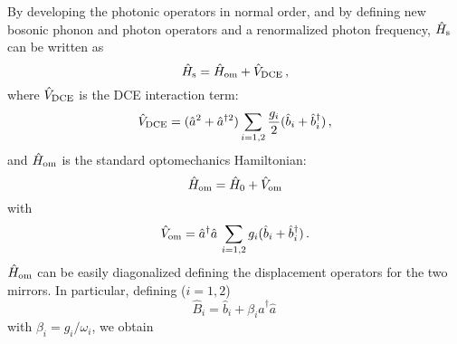 \documentclass[aps,pra,twocolumn,floatfix,longbibliography, superscriptaddress]{revtex4-1}
\newcommand{\be}{\begin{equation}}
\newcommand{\ee}{\end{equation}}
\begin{document}
By developing the photonic operators in normal order, and by defining 
new bosonic phonon and photon operators and a renormalized photon frequency, $\hat H_{\rm s}$ can be written 
as  	
\be\label{H}
\hat H_{\rm s}=\hat H_{\rm om} +\hat V_{\rm DCE}\, ,
\ee	
where $\hat V_{\rm DCE}$ is the DCE interaction term:
\begin{equation}
\hat V_{\rm DCE} = (\hat a^2  + \hat a^{\dag 2}) \sum_{i=1,2} \frac{ g_i}{2} (\hat b_i + \hat b_i^\dag )\, ,
\end{equation}
and $\hat H_{\rm om}$ is the standard optomechanics Hamiltonian:
\be
\hat H_{\rm om}=\hat H_0 + \hat V_{\rm om}
\ee
with
\begin{equation}
\hat V_{\rm om} =  \hat a^\dag \hat a\,\sum_{i=1,2} g_i (\hat b_i + \hat b_i^\dag )\, .
\end{equation}
$\hat H_{\rm om}$
can be easily diagonalized defining the  displacement operators for the two mirrors.
In particular, defining ($i=1,2$)
\be \label{Bdress}
\hat B_i= \hat b_i +\beta_i \hat a^\dag \hat a\,
\ee
with
$\beta_i=g_i/\omega_i$, we obtain
\end{document}
